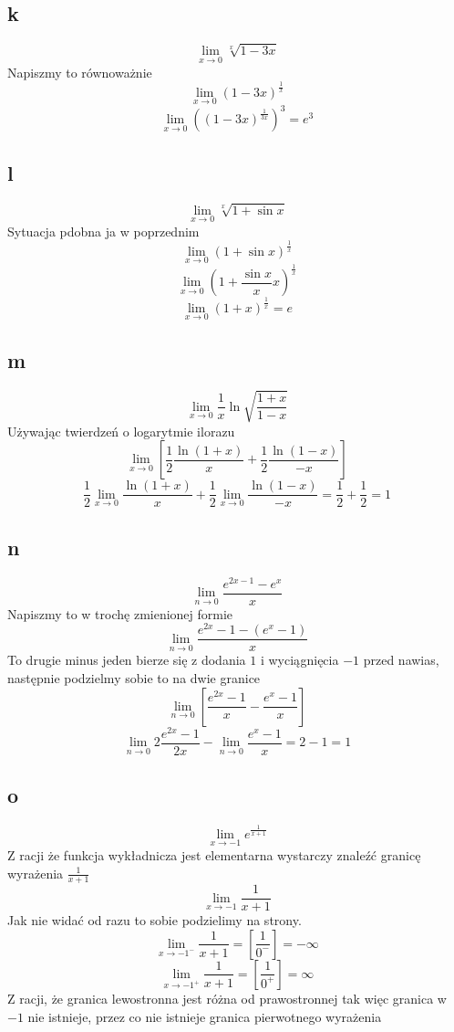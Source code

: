 \documentclass{article}
\begin{document}
\subsection{k}
$$\lim_{x \to 0}{\sqrt[x]{1-3x}} $$
Napiszmy to równoważnie
$$\lim_{x \to 0}{{(1-3x)}^{\frac{1}{x}}} $$ 
$$\lim_{x \to 0}{\left({(1-3x)}^{\frac{1}{3x}}\right)^3}  = e^3$$ 

\subsection{l}
$$\lim_{x \to 0}{\sqrt[x]{1 + \sin{x}}} $$
Sytuacja pdobna ja w poprzednim
$$\lim_{x \to 0}{\left( 1 + \sin{x}\right)^\frac{1}{x}} $$
$$\lim_{x \to 0}{\left( 1 + \frac{\sin{x}}{x}x\right)^\frac{1}{x}} $$
$$\lim_{x \to 0}{\left( 1 +x\right)^\frac{1}{x}} = e $$

\subsection{m}
$$\lim_{x \to 0}{\frac{1}{x}\ln{\sqrt{\frac{1+x}{1-x}}}}$$
Używając twierdzeń o logarytmie ilorazu
$$\lim_{x \to 0}{\left[\frac{1}{2}\frac{\ln{(1+x)}}{x} + \frac{1}{2}\frac{\ln{(1-x)}}{-x}\right]}$$
$$\frac{1}{2}\lim_{x \to 0}{\frac{\ln{(1+x)}}{x}} + \frac{1}{2}\lim_{x \to 0}{\frac{\ln{(1-x)}}{-x}} = \frac{1}{2} + \frac{1}{2} = 1$$

\subsection{n}
$$\lim_{n \to 0}{\frac{e^{2x-1} - e^{x}}{x}} $$
Napiszmy to w trochę zmienionej formie
$$\lim_{n \to 0}{\frac{e^{2x} - 1 - (e^{x}-1)}{x}} $$
To drugie minus jeden bierze się z dodania $1$ i wyciągnięcia $-1$ przed nawias, następnie podzielmy sobie to na dwie granice
$$\lim_{n \to 0}{\left[\frac{e^{2x}-1}{x} - \frac{e^{x}-1}{x}\right]} $$
$$\lim_{n \to 0}{2\frac{e^{2x}-1}{2x}} - \lim_{n \to 0}{\frac{e^{x}-1}{x}} = 2 - 1 = 1$$

\subsection{o}
$$\lim_{x \to -1}{e^{\frac{1}{x+1}}} $$
Z racji że funkcja wykładnicza jest elementarna wystarczy znaleźć granicę wyrażenia $ \frac{1}{x+1} $
$$\lim_{x \to -1}{\frac{1}{x+1}} $$
Jak nie widać od razu to sobie podzielimy na strony.
$$\lim_{x \to -1^-}{\frac{1}{x+1}} = \left[\frac{1}{0^-}\right] = -\infty$$
$$\lim_{x \to -1^+}{\frac{1}{x+1}} = \left[\frac{1}{0^+}\right] = \infty$$
Z racji, że granica lewostronna jest różna od prawostronnej tak więc granica w $-1$ nie istnieje, przez co nie istnieje granica pierwotnego wyrażenia
\end{document}
